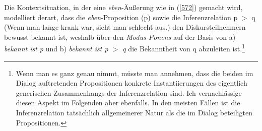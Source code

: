 Die Kontextsituation, in der eine \textit{eben}-Äußerung wie in (\ref{572}) gemacht wird, modelliert \citet[208]{Karagjosova2004} derart, dass die \textit{eben}-Proposition (p) sowie die Inferenzrelation p $>$ q (\glq Wenn man lange krank war, sieht man schlecht aus.\grq {}) den Diskursteilnehmern bewusst bekannt ist, weshalb über den \textit{Modus Ponens}  auf der Basis von a) \textit{bekannt ist p} und b) \textit{bekannt ist p $>$ q} die Bekanntheit von q abzuleiten ist.\footnote{Wenn man es ganz genau nimmt, müsste man annehmen, dass die beiden im Dialog auftretenden Propositionen konkrete Instantiierungen des eigentlich generischen Zusammenhangs der Inferenzrelation sind. Ich vernachlässige diesen Aspekt im Folgenden aber ebenfalls. In den meisten Fällen ist die Inferenzrelation tatsächlich allgemeinerer Natur als die im Dialog beteiligten Propositionen.
}

